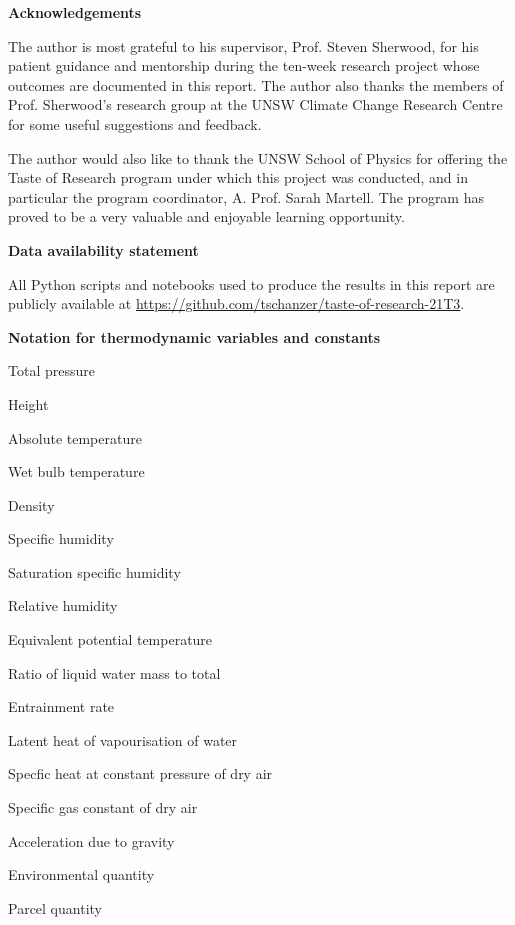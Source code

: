 \documentclass[12pt,titlepage]{article}
\begin{document}
\begin{center}
	\large
	\textbf{Acknowledgements}
\end{center}
The author is most grateful to his supervisor, Prof. Steven Sherwood, for
his patient guidance and mentorship during the ten-week research project
whose outcomes are documented in this report. The author also thanks
the members of Prof. Sherwood's research group at the UNSW Climate
Change Research Centre for some useful suggestions and feedback.

The author would also like to thank the UNSW School of Physics for
offering the Taste of Research program under which this project was
conducted, and in particular the program coordinator, A. Prof. Sarah
Martell. The program has proved to be a very valuable and enjoyable
learning opportunity.

\begin{center}
	\large
	\textbf{Data availability statement}
\end{center}
All Python scripts and notebooks used to produce the results in this
report are publicly available at
\url{https://github.com/tschanzer/taste-of-research-21T3}.

\begin{center}
	\large
	\textbf{Notation for thermodynamic variables and constants}
\end{center}
\begin{description}[align=right,labelwidth=2cm,itemsep=0mm]
	\item[$p$] Total pressure
	\item[$z$] Height
	\item[$T$] Absolute temperature
	\item[$T_W$] Wet bulb temperature
	\item[$\rho$] Density
	\item[$q$] Specific humidity
	\item[$q^*(p,T)$] Saturation specific humidity
	\item[$\mathrm{RH}$] Relative humidity
	\item[$\theta_e(p,T,q)$] Equivalent potential temperature
	\item[$l$] Ratio of liquid water mass to total
	\item[$\lambda$] Entrainment rate
	\item[$L_v$] Latent heat of vapourisation of water
	\item[$c_p$] Specfic heat at constant pressure of dry air
	\item[$R$] Specific gas constant of dry air
	\item[$g$] Acceleration due to gravity
	\item[$(\cdot)_E$] Environmental quantity
	\item[$(\cdot)_P$] Parcel quantity
\end{description}
\end{document}
